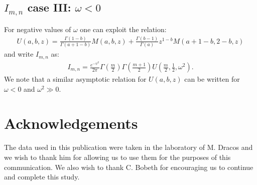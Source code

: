 \documentclass[preprint,12pt]{elsarticle}
\begin{document}
\subsection*{$I_{m,n}$ case III: $ \omega <0$}
%

For negative values of $\omega$ one can exploit the relation:
\begin{align}
U(a,b,z) = \frac{\Gamma(1-b) }{\Gamma(a+1-b)}M(a,b,z) + \frac{\Gamma(b-1) }{\Gamma(a)} z^{1-b} M(a+1-b, 2-b, z )
\end{align}
and write $I_{m,n}$ as:
\begin{align}
I_{m,n} = \frac{ e^{ -\psi^2 } }{ 2\pi }\Gamma\left( \frac{m}{2} \right)   \Gamma\left( \frac{m+1}{2} \right) U\left( \frac{m}{2}, \frac{1}{2}, \omega^2  \right). 
\end{align}
We note that a similar  asymptotic relation for $U(a,b,z)$ can be written for $\omega<0$ and $\omega^2 \gg 0$. 




\section*{Acknowledgements}

The data used in this publication were taken in the laboratory of M. Dracos and we wish to thank him for allowing us to use them for the purposes of this communication. 
We also wish to thank C. Bobeth for encouraging us to continue and complete this study.
\end{document}
